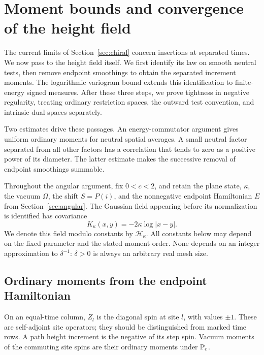 \section{Moment bounds and convergence of the height field}\label{sec:probability}

The current limits of Section~\ref{sec:chiral} concern insertions at
separated times. We now pass to the height field itself. We first identify its law on smooth neutral tests, then remove endpoint
smoothings to obtain the separated increment moments. The logarithmic
variogram bound extends this identification to finite-energy signed
measures. After these three steps, we prove tightness in negative
regularity, treating ordinary restriction spaces, the outward test
convention, and intrinsic dual spaces separately.

Two estimates drive these passages. An energy-commutator argument gives
uniform ordinary moments for neutral spatial averages. A small neutral
factor separated from all other factors has a correlation that tends to
zero as a positive power of its diameter. The latter estimate makes the
successive removal of endpoint smoothings summable.

Throughout the angular argument, fix \(0<c<2\), and retain the plane state,
\(\kappa\), the vacuum \(\Omega\), the shift \(S=P(i)\), and the
nonnegative endpoint Hamiltonian \(E\) from Section~\ref{sec:angular}.
The Gaussian field appearing before its normalization is identified has
covariance
\begin{equation}\label{eq:prob-log-kernel}
 K_\kappa(x,y)=-2\kappa\log|x-y|.
\end{equation}
We denote this field modulo constants by \(\mathcal H_\kappa\).
All constants below may depend on the fixed parameter and the stated
moment order. None depends on an integer approximation to \(\delta^{-1}\):
\(\delta>0\) is always an arbitrary real mesh size.

\subsection{Ordinary moments from the endpoint Hamiltonian}

On an equal-time column, \(Z_l\) is the diagonal spin at site \(l\), with
values \(\pm1\). These are self-adjoint site operators; they should be
distinguished from marked time rows. A path height increment is the
negative of its step spin. Vacuum moments of the commuting site spins
are their ordinary moments under \(\P_c\).

